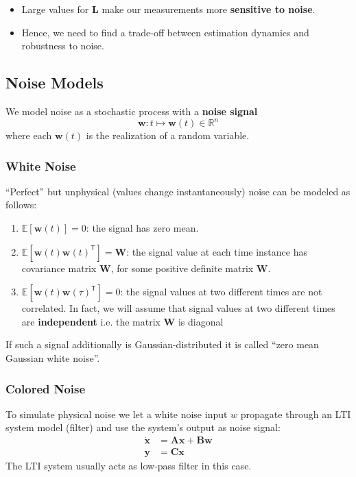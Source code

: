 \newpar{}


\begin{itemize}
    \item Large values for $\mathbf{L}$ make our measurements more \textbf{sensitive to noise}.
    \item Hence, we need to find a trade-off between estimation dynamics and robustness to noise.
\end{itemize}

\subsection{Noise Models}
We model noise as a stochastic process with a \textbf{noise signal}
\begin{equation*}
    \mathbf{w}:t\mapsto \mathbf{w}(t)\in\mathbb{R}^n
\end{equation*}
where each $\mathbf{w}(t)$ is the realization of a random variable.

\subsubsection{White Noise}
``Perfect'' but unphysical (values change instantaneously) noise can be modeled as follows:
\begin{enumerate}
    \item $\mathbb{E}[\mathbf{w}(t)]=0$:\newline
          the signal has zero mean.
    \item $\mathbb{E}[\mathbf{w}(t){\mathbf{w}(t)}^{\mathsf{T}}]=\mathbf{W}$:\newline
          the signal value at each time instance has covariance matrix $\mathbf{W}$, for some positive definite matrix $\mathbf{W}$.
    \item $\mathbb{E}[\mathbf{w}(t){\mathbf{w}(\tau)}^{\mathsf{T}}]=0$:\newline
          the signal values at two different times are not correlated. In fact, we will assume that signal values at two different times are \textbf{independent} i.e. the matrix $\mathbf{W}$ is diagonal
\end{enumerate}
If such a signal additionally is Gaussian-distributed it is called ``zero mean Gaussian white noise''.

\subsubsection{Colored Noise}
To simulate physical noise we let a white noise input $w$ propagate through an LTI system model (filter) and use the system's output as noise signal:
\begin{align*}
    \dot{\mathbf{x}} & =\mathbf{Ax}+\mathbf{Bw} \\
    \mathbf{ y}      & = \mathbf{Cx}
\end{align*}
The LTI system usually acts as low-pass filter in this case.


